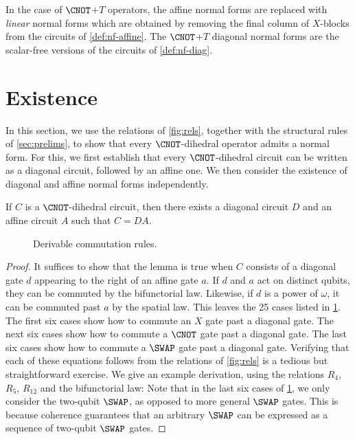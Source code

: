 \documentclass{eptcs}
\begin{document}
\begin{remark}
  \label{rem:cnott-pres2}
  In the case of $\CNOT$+$T$ operators, the affine normal forms are
  replaced with \emph{linear} normal forms which are obtained by
  removing the final column of $X$-blocks from the circuits of
  \cref{def:nf-affine}. The $\CNOT$+$T$ diagonal normal forms are the
  scalar-free versions of the circuits of \cref{def:nf-diag}.
\end{remark}

\section{Existence}
\label{sec:existence}

In this section, we use the relations of \cref{fig:rels}, together
with the structural rules of \cref{sec:prelims}, to show that every
$\CNOT$-dihedral operator admits a normal form. For this, we first
establish that every $\CNOT$-dihedral circuit can be written as a
diagonal circuit, followed by an affine one. We then consider the
existence of diagonal and affine normal forms independently.

\begin{lemma}
  \label{lem:DA-decomp}
  If $C$ is a $\CNOT$-dihedral circuit, then there exists a diagonal
  circuit $D$ and an affine circuit $A$ such that $C=DA$.
\end{lemma}

\begin{figure}
  
  \caption{Derivable commutation rules.}
  \label{fig:DA-cases}
\end{figure}

\begin{proof}
  It suffices to show that the lemma is true when $C$ consists of a
  diagonal gate $d$ appearing to the right of an affine gate $a$. If
  $d$ and $a$ act on distinct qubits, they can be commuted by the
  bifunctorial law. Likewise, if $d$ is a power of $\omega$, it can be
  commuted past $a$ by the spatial law. This leaves the 25 cases
  listed in \cref{fig:DA-cases}. The first six cases show how to
  commute an $X$ gate past a diagonal gate. The next six cases show
  how to commute a $\CNOT$ gate past a diagonal gate. The last six
  cases show how to commute a $\SWAP$ gate past a diagonal
  gate. Verifying that each of these equations follows from the
  relations of \cref{fig:rels} is a tedious but straightforward
  exercise. We give an example derivation, using the relations $R_4$,
  $R_5$, $R_{12}$ and the bifunctorial law: \DerivationOne Note that
  in the last six cases of \cref{fig:DA-cases}, we only consider the
  two-qubit $\SWAP$, as opposed to more general $\SWAP$ gates. This is
  because coherence guarantees that an arbitrary $\SWAP$ can be
  expressed as a sequence of two-qubit $\SWAP$ gates.
\end{proof}
\end{document}
